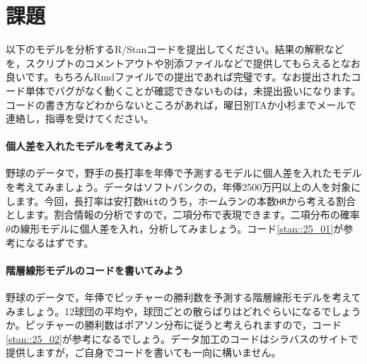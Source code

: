 \documentclass{ltjsbook}
\begin{document}
\section{課題}
以下のモデルを分析するR/Stanコードを提出してください。結果の解釈などを，スクリプトのコメントアウトや別添ファイルなどで提供してもらえるとなお良いです。もちろんRmdファイルでの提出であれば完璧です。なお提出されたコード単体でバグがなく動くことが確認できないものは，未提出扱いになります。コードの書き方などわからないところがあれば，曜日別TAか小杉までメールで連絡し，指導を受けてください。

\paragraph{個人差を入れたモデルを考えてみよう}
野球のデータで，野手の長打率を年俸で予測するモデルに個人差を入れたモデルを考えてみましょう。データはソフトバンクの，年俸2500万円以上の人を対象にします。今回，長打率は安打数\verb|Hit|のうち，ホームランの本数\verb|HR|から考える割合とします。割合情報の分析ですので，二項分布で表現できます。二項分布の確率$\theta$の線形モデルに個人差を入れ，分析してみましょう。コード\ref{stan::25_01}が参考になるはずです。
\paragraph{階層線形モデルのコードを書いてみよう}
野球のデータで，年俸でピッチャーの勝利数を予測する階層線形モデルを考えてみましょう。12球団の平均や，球団ごとの散らばりはどれぐらいになるでしょうか。ピッチャーの勝利数はポアソン分布に従うと考えられますので，コード\ref{stan::25_02}が参考になるでしょう。データ加工のコードはシラバスのサイトで提供しますが，ご自身でコードを書いても一向に構いません。
\end{document}
